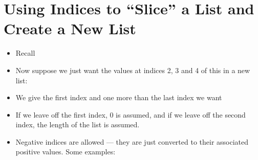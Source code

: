 \documentclass[letterpaper,10pt,english]{sphinxmanual}
\begin{document}
\section{Using Indices to “Slice” a List and Create a New List}
\label{\detokenize{lecture_notes/lec10_lists2:using-indices-to-slice-a-list-and-create-a-new-list}}\begin{itemize}
\item {} 
Recall

%
\begin{sphinxVerbatim}[commandchars=\\\{\}]
  \PYG{p}{[}      \PYGZbs{}
        \PYG{p}{]}
\end{sphinxVerbatim}

\item {} 
Now suppose we just want the values at indices 2, 3 and 4 of this in
a new list:

%
\begin{sphinxVerbatim}[commandchars=\\\{\}]
  \PYG{p}{[}\PYG{p}{]}
\PYG{g+go}{[ 320.03, 322.16, 328.07, 333.91, 341.47, 348.92, 357.29, 363.77,}
\PYG{g+go}{   371.51, 382.47, 392.95 ]}
\end{sphinxVerbatim}

\item {} 
We give the first index and one more than the last index we want

\item {} 
If we leave off the first index, 0 is assumed, and if we leave off
the second index, the length of the list is assumed.

\item {} 
Negative indices are allowed — they are just converted to their
associated positive values. Some examples:


\end{itemize}
\end{document}

